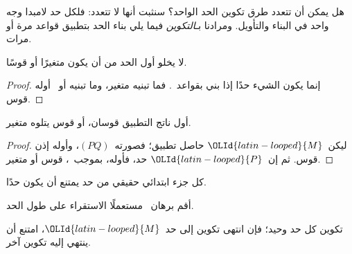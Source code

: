 \documentclass[../../../include/open-logic-section]{subfiles}
\begin{document}

هل يمكن أن تتعدد طرق تكوين الحد الواحد؟ سنثبت أنها لا تتعدد:
فلكل حد لامبدا وجه واحد في البناء والتأويل. ومرادنا بـ\emph{التكوين}
فيما يلي بناء الحد بتطبيق قواعد  مرة أو مرات.

\begin{lem}
لا يخلو أول الحد من أن يكون متغيرًا أو قوسًا.
\end{lem}

\begin{proof}
إنما يكون الشيء حدًا إذا بني بقواعد~.
فما تبنيه  متغير، وما تبنيه
 أو~ أوله قوس.
\end{proof}

\begin{lem}
أول ناتج التطبيق قوسان، أو قوس يتلوه متغير.
\end{lem}

\begin{proof}
ليكن~$\OLId{latin-looped}{M}$ حاصل تطبيق؛ فصورته~$(PQ)$، وأوله إذن قوس.
ثم إن~$\OLId{latin-looped}{P}$ حد، فأوله، بموجب~، قوس أو متغير.
\end{proof}

\begin{lem}
كل جزء ابتدائي حقيقي من حد يمتنع أن يكون حدًا.
\end{lem}

\begin{prob}
أقم برهان~ مستعملًا الاستقراء على طول الحد.
\end{prob}

\begin{prop} 
تكوين كل حد وحيد؛ فإن انتهى تكوين إلى حد~$\OLId{latin-looped}{M}$، امتنع أن ينتهي إليه تكوين آخر.
\end{prop}
\end{document}
